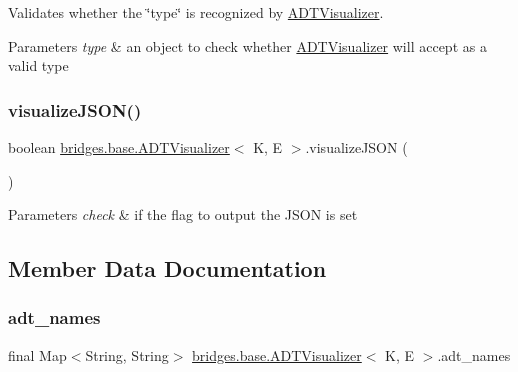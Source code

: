 Validates whether the \char`\"{}type\char`\"{} is recognized by \hyperlink{classbridges_1_1base_1_1_a_d_t_visualizer}{A\+D\+T\+Visualizer}. 
\begin{DoxyParams}{Parameters}
{\em type} & an object to check whether \hyperlink{classbridges_1_1base_1_1_a_d_t_visualizer}{A\+D\+T\+Visualizer} will accept as a valid type \\
\hline
\end{DoxyParams}
\hypertarget{classbridges_1_1base_1_1_a_d_t_visualizer_a1aa47f3633239060197b523cb6b86e06}{}\label{classbridges_1_1base_1_1_a_d_t_visualizer_a1aa47f3633239060197b523cb6b86e06} 
\subsubsection{\texorpdfstring{visualize\+J\+S\+O\+N()}{visualizeJSON()}}
{\footnotesize\ttfamily boolean \hyperlink{classbridges_1_1base_1_1_a_d_t_visualizer}{bridges.\+base.\+A\+D\+T\+Visualizer}$<$ K, E $>$.visualize\+J\+S\+ON (\begin{DoxyParamCaption}{ }\end{DoxyParamCaption})}


\begin{DoxyParams}{Parameters}
{\em check} & if the flag to output the J\+S\+ON is set \\
\hline
\end{DoxyParams}


\subsection{Member Data Documentation}
\hypertarget{classbridges_1_1base_1_1_a_d_t_visualizer_a6646d020143637569d607fa109c71ff9}{}\label{classbridges_1_1base_1_1_a_d_t_visualizer_a6646d020143637569d607fa109c71ff9} 
\subsubsection{\texorpdfstring{adt\+\_\+names}{adt\_names}}
{\footnotesize\ttfamily final Map$<$String, String$>$ \hyperlink{classbridges_1_1base_1_1_a_d_t_visualizer}{bridges.\+base.\+A\+D\+T\+Visualizer}$<$ K, E $>$.adt\+\_\+names}

